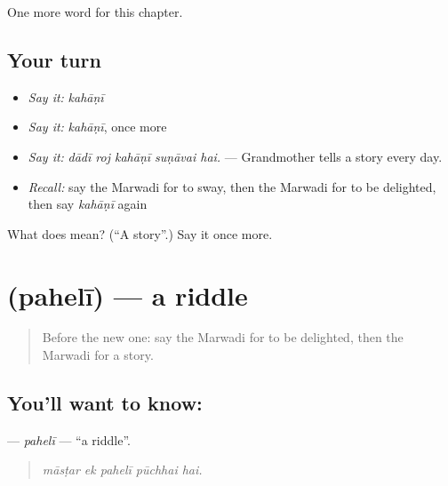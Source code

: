 \begin{grammarlens}[title={What you've built}]
One more word for this chapter.
\end{grammarlens}

\subsection*{Your turn}
\begin{itemize}
\raggedright
  \item \emph{Say it:} \emph{kahāṇī}
  \item \emph{Say it:} \emph{kahāṇī}, once more
  \item \emph{Say it:} \emph{dādī roj kahāṇī suṇāvai hai.} — Grandmother tells a story every day.
  \item \emph{Recall:} say the Marwadi for to sway, then the Marwadi for to be delighted, then say \emph{kahāṇī} again
\end{itemize}

\begin{tcolorbox}[breakable,colback=teal!4,colframe=teal!35!black,title={Before you move on}]
What does  mean? (\textquotedblleft{}A story\textquotedblright{}.) Say it once more.
\end{tcolorbox}
\section[\texorpdfstring{\mw{पहेली} (pahelī)}{पहेली (pahelī)}]{ (pahelī) — a riddle}

\label{lesson:MW-C278-paheli}



\begin{quote}
Before the new one: say the Marwadi for to be delighted, then the Marwadi for a story.
\end{quote}

\subsection*{You'll want to know: }
\textbf{} — \emph{pahelī} — \textquotedblleft{}a riddle\textquotedblright{}.

\begin{quote}
    
\end{quote}

\begin{quote}
\emph{māsṭar ek pahelī pūchhai hai.}
\end{quote}

